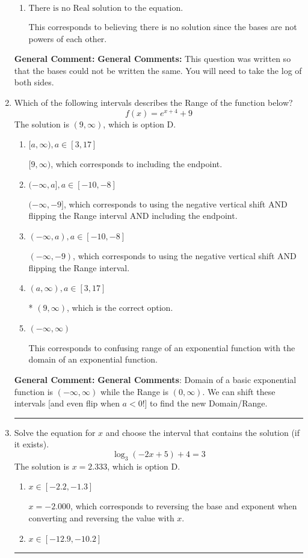 \documentclass{extbook}[14pt]
\newcommand{\litem}[1]{\item #1

\rule{\textwidth}{0.4pt}}
\begin{document}
\begin{enumerate}
{\begin{enumerate}[label=\Alph*.]
* $x = -8.952$, which is the correct option.
\item \( \text{There is no Real solution to the equation.} \)

This corresponds to believing there is no solution since the bases are not powers of each other.
\end{enumerate}

\textbf{General Comment:} \textbf{General Comments:} This question was written so that the bases could not be written the same. You will need to take the log of both sides.
}
\litem{
Which of the following intervals describes the Range of the function below?
\[ f(x) = e^{x+4}+9 \]The solution is \( (9, \infty) \), which is option D.\begin{enumerate}[label=\Alph*.]
\item \( [a, \infty), a \in [3, 17] \)

$[9, \infty)$, which corresponds to including the endpoint.
\item \( (-\infty, a], a \in [-10, -8] \)

$(-\infty, -9]$, which corresponds to using the negative vertical shift AND flipping the Range interval AND including the endpoint.
\item \( (-\infty, a), a \in [-10, -8] \)

$(-\infty, -9)$, which corresponds to using the negative vertical shift AND flipping the Range interval.
\item \( (a, \infty), a \in [3, 17] \)

* $(9, \infty)$, which is the correct option.
\item \( (-\infty, \infty) \)

This corresponds to confusing range of an exponential function with the domain of an exponential function.
\end{enumerate}

\textbf{General Comment:} \textbf{General Comments}: Domain of a basic exponential function is $(-\infty, \infty)$ while the Range is $(0, \infty)$. We can shift these intervals [and even flip when $a<0$!] to find the new Domain/Range.
}
\litem{
Solve the equation for $x$ and choose the interval that contains the solution (if it exists).
\[ \log_{3}{(-2x+5)}+4 = 3 \]The solution is \( x = 2.333 \), which is option D.\begin{enumerate}[label=\Alph*.]
\item \( x \in [-2.2, -1.3] \)

$x = -2.000$, which corresponds to reversing the base and exponent when converting and reversing the value with $x$.
\item \( x \in [-12.9, -10.2] \)


\end{enumerate}}
\end{enumerate}
\end{document}
